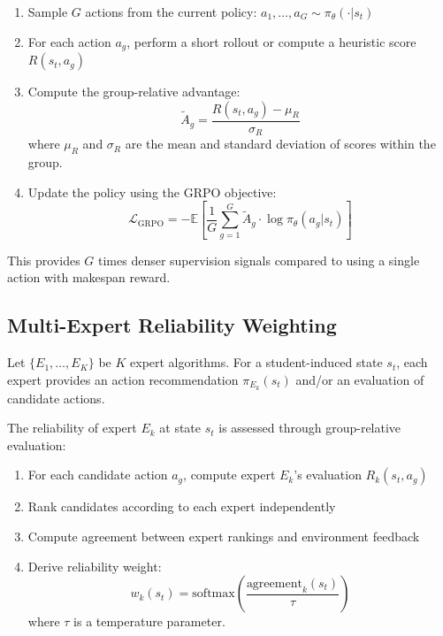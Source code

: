 \documentclass[11pt,a4paper]{article}
\begin{document}
\begin{enumerate}[leftmargin=*]
    \item Sample $G$ actions from the current policy: $a_1, \ldots, a_G \sim \pi_\theta(\cdot | s_t)$
    \item For each action $a_g$, perform a short rollout or compute a heuristic score $R(s_t, a_g)$
    \item Compute the group-relative advantage:
    \begin{equation}
        \tilde{A}_g = \frac{R(s_t, a_g) - \mu_R}{\sigma_R}
    \end{equation}
    where $\mu_R$ and $\sigma_R$ are the mean and standard deviation of scores within the group.
    \item Update the policy using the GRPO objective:
    \begin{equation}
        \mathcal{L}_{\text{GRPO}} = -\mathbb{E}\left[\frac{1}{G}\sum_{g=1}^{G} \tilde{A}_g \cdot \log \pi_\theta(a_g | s_t)\right]
    \end{equation}
\end{enumerate}

This provides $G$ times denser supervision signals compared to using a single action with makespan reward.

\subsection{Multi-Expert Reliability Weighting}

Let $\{E_1, \ldots, E_K\}$ be $K$ expert algorithms. For a student-induced state $s_t$, each expert provides an action recommendation $\pi_{E_k}(s_t)$ and/or an evaluation of candidate actions.

The reliability of expert $E_k$ at state $s_t$ is assessed through group-relative evaluation:

\begin{enumerate}[leftmargin=*]
    \item For each candidate action $a_g$, compute expert $E_k$'s evaluation $R_k(s_t, a_g)$
    \item Rank candidates according to each expert independently
    \item Compute agreement between expert rankings and environment feedback
    \item Derive reliability weight:
    \begin{equation}
        w_k(s_t) = \text{softmax}\left(\frac{\text{agreement}_k(s_t)}{\tau}\right)
    \end{equation}
    where $\tau$ is a temperature parameter.
\end{enumerate}
\end{document}
